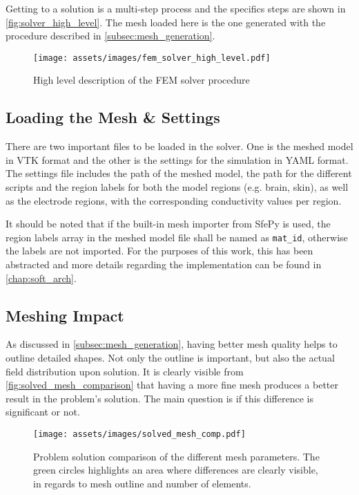 Getting to a solution is a multi-step process and the specifics steps are shown in \autoref{fig:solver_high_level}. The mesh loaded here is the one generated with the procedure described in \ref{subsec:mesh_generation}.

\begin{figure}[H]
    \centering
    \texttt{[image: assets/images/fem\_solver\_high\_level.pdf]}
    \caption{High level description of the \gls{FEM} solver procedure}
    \label{fig:solver_high_level}
\end{figure}

\subsection{Loading the Mesh \& Settings}

There are two important files to be loaded in the solver. One is the meshed model in \gls{VTK} format and the other is the settings for the simulation in \gls{YAML} format. The settings file includes the path of the meshed model, the path for the different scripts and the region labels for both the model regions (e.g. brain, skin), as well as the electrode regions, with the corresponding conductivity values per region.

It should be noted that if the built-in mesh importer from SfePy is used, the region labels array in the meshed model file shall be named as \texttt{mat\_id}, otherwise the labels are not imported. For the purposes of this work, this has been abstracted and more details regarding the implementation can be found in \autoref{chap:soft_arch}.

\subsection{Meshing Impact}
\label{sec:mesh_quality}

As discussed in \ref{subsec:mesh_generation}, having better mesh quality helps to outline detailed shapes. Not only the outline is important, but also the actual field distribution upon solution. It is clearly visible from \autoref{fig:solved_mesh_comparison} that having a more fine mesh produces a better result in the problem's solution. The main question is if this difference is significant or not.

\begin{figure}[H]
    \centering
    \texttt{[image: assets/images/solved\_mesh\_comp.pdf]}
    \caption[Problem solution comparison for the different $q$ mesh parameters.]{Problem solution comparison of the different mesh parameters. The green circles highlights an area where differences are clearly visible, in regards to mesh outline and number of elements.}
    \label{fig:solved_mesh_comparison}
\end{figure}

